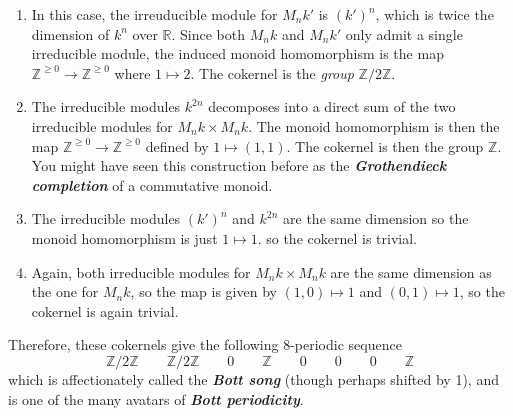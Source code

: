 \documentclass[psamsfonts, 12pt]{amsart}
\theoremstyle{definition}
\theoremstyle{remark}
\newcommand{\R}{\mathbb{R}}
\newcommand{\ib}[1]{\textbf{\textit{#1}}}
\newcommand{\Z}{\mathbb{Z}}
\begin{document}
\begin{enumerate}
  \item In this case, the irreuducible module for $M_nk'$ is $(k')^n$, which is twice the
  dimension of $k^n$ over $\R$. Since both $M_nk$ and $M_nk'$ only admit a single
  irreducible module, the induced monoid homomorphism is the map
  $\Z^{\geq 0} \to \Z^{\geq 0}$ where $1 \mapsto 2$. The cokernel is the \emph{group}
  $\Z/2\Z$.
  \item The irreducible modules $k^{2n}$ decomposes into a direct sum of the two
  irreducible modules for $M_nk \times M_nk$. The monoid homomorphism is then the map
  $\Z^{\geq 0} \to \Z^{\geq 0}$ defined by $1 \mapsto (1,1)$. The cokernel is then the
  group $\Z$. You might have seen this construction before as the
  \ib{Grothendieck completion} of a commutative monoid.
  \item The irreducible modules $(k')^n$ and $k^{2n}$ are the same dimension so the
  monoid homomorphism is just $1\mapsto 1$. so the cokernel is trivial.
  \item Again, both irreducible modules for $M_nk \times M_nk$ are the same dimension as
  the one for $M_nk$, so the map is given by $(1,0) \mapsto 1$ and $(0,1)\mapsto 1$, so
  the cokernel is again trivial.
\end{enumerate}
%
Therefore, these cokernels give the following $8$-periodic sequence
\[
\Z/2\Z \qquad \Z/2\Z \qquad 0 \qquad \Z \qquad 0 \qquad 0 \qquad 0 \qquad \Z
\]
which is affectionately called the \ib{Bott song} (though perhaps shifted by 1), and is
one of the many avatars of \ib{Bott periodicity}.
%
\end{document}
